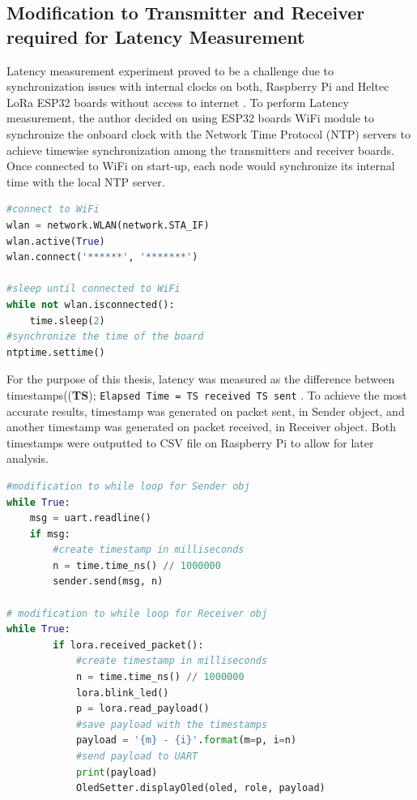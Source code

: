 \documentclass[oneside,12pt]{book}
\begin{document}
\subsection{Modification to Transmitter and Receiver required for Latency Measurement}
Latency measurement experiment proved to be a challenge due to synchronization issues with internal clocks on both, Raspberry Pi and Heltec LoRa ESP32 boards without access to internet \citep{9035389}. To perform Latency measurement, the author decided on using ESP32 boards WiFi module to synchronize the onboard clock with the Network Time Protocol (NTP) servers to achieve timewise synchronization among the transmitters and receiver boards. Once connected to WiFi on start-up, each node would synchronize its internal time with the local NTP server.
\begin{lstlisting}[language=Python, caption=Synchronization with NTP server for the latency experiment - MicroPython,captionpos=b]
#connect to WiFi
wlan = network.WLAN(network.STA_IF)
wlan.active(True)
wlan.connect('******', '*******')

#sleep until connected to WiFi
while not wlan.isconnected():    
    time.sleep(2)
#synchronize the time of the board
ntptime.settime()
\end{lstlisting}
For the purpose of this thesis, latency was  measured as the difference between timestamps((\textbf{TS}); \texttt{Elapsed Time = TS received {\textminus} TS sent} . To achieve the most accurate results, timestamp was generated on packet sent, in Sender object, and another timestamp was generated on packet received, in Receiver object. Both timestamps were outputted to CSV file on Raspberry Pi to allow for later analysis.   
\begin{lstlisting}[language=Python, caption=Modification of Sender class for the latency experiment - MicroPython,captionpos=b]
#modification to while loop for Sender obj
while True:
    msg = uart.readline()
    if msg:
        #create timestamp in milliseconds
        n = time.time_ns() // 1000000
        sender.send(msg, n)

# modification to while loop for Receiver obj
while True:
        if lora.received_packet():
            #create timestamp in milliseconds
            n = time.time_ns() // 1000000
            lora.blink_led()
            p = lora.read_payload()
            #save payload with the timestamps
            payload = '{m} - {i}'.format(m=p, i=n)
            #send payload to UART
            print(payload)
            OledSetter.displayOled(oled, role, payload)
\end{lstlisting}
\end{document}
